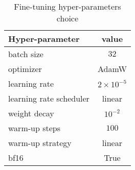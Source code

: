 \begin{table}[h]
    \centering
    \caption{Fine-tuning hyper-parameters choice}\label{tab:ft_hyperparams}
    \renewcommand{\arraystretch}{1.5} %
    \begin{tabular}{| l | c |} %
    \hline %
    \textbf{Hyper-parameter} & \textbf{value} \\
    \hline %
    batch size      & $32$ \\ \hline  
    optimizer       & AdamW \\ \hline  
    learning rate     & $2 \times 10^{-5}$ \\ \hline  
    learning rate scheduler & linear \\ \hline
    weight decay       & $10^{-2}$ \\ \hline  
    warm-up steps & $100$ \\ \hline  
    warm-up strategy & linear \\ \hline
    bf16    & True \\ \hline  
    \end{tabular}
\end{table}
